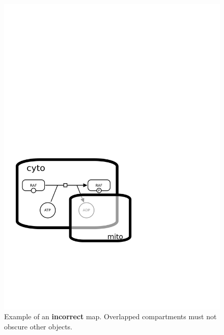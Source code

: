 \begin{figure}[htb]
  \centering
  \includegraphics[scale = 0.45]{examples/compartment_overlapping_wrong}
  \caption{Example of an \textbf{incorrect} map.  Overlapped compartments must not obscure other objects.}
  \label{fig:techref:overlap-bad}
\end{figure}



